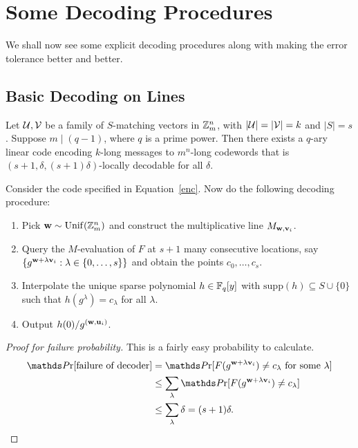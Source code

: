 \section{Some Decoding Procedures}

We shall now see some explicit decoding procedures along with making the error tolerance better and better.

\subsection{Basic Decoding on Lines}

\begin{greybox}
    \begin{proposition}
Let $\mathcal{U},\mathcal{V}$ be a family of $S$-matching vectors in $\mathbb{Z}_m^n$,
with $|\mathcal{U}| = |\mathcal{V}| = k$ and $|S| = s$. Suppose $m \mid (q-1)$, where
$q$ is a prime power. Then there exists a $q$-ary linear code encoding
$k$-long messages to $m^n$-long codewords that is
$(s+1,\delta,(s+1)\delta)$-locally decodable for all $\delta$.
\end{proposition}
\end{greybox}

Consider the code specified in Equation~\ref{enc}. Now do the following decoding procedure:
\begin{enumerate}
    \item Pick $\mathbf{w}\sim\mathrm{Unif}(\mathbb{Z}_m^n)$ and construct the multiplicative line $M_{\mathbf{w}, \mathbf{v}_i}$.
    \item Query the $M$-evaluation of $F$ at $s+1$ many consecutive locations, say $\{g^{\mathbf{w}+\lambda \mathbf{v}_i} : \lambda\in\{0,\ldots,s\}\}$ and obtain the points $c_0,\ldots,c_s$. 
    \item Interpolate the unique sparse polynomial $h\in\mathbb{F}_q[y]$ with $\mathrm{supp}(h)\subseteq S\cup\{0\}$ such that $h(g^{\lambda}) = c_{\lambda}$ for all $\lambda$.
    \item Output $h(0)/g^{(\mathbf{w}, \mathbf{u}_i)}$.
\end{enumerate}

\begin{proof}[Proof for failure probability] This is a fairly easy probability to calculate.
    \begin{align*}
        \Pr[\text{failure of decoder}] 
        & = \Pr[F(g^{\bfw + \lambda\bfv_i}) \neq c_{\lambda}\text{ for some $\lambda$}] \\
        & \leq \sum_{\lambda} \Pr[F(g^{\bfw + \lambda\bfv_i}) \neq c_{\lambda}]\\
        & \leq \sum_{\lambda}\delta = (s+1)\delta.
    \end{align*}
    
\end{proof}


